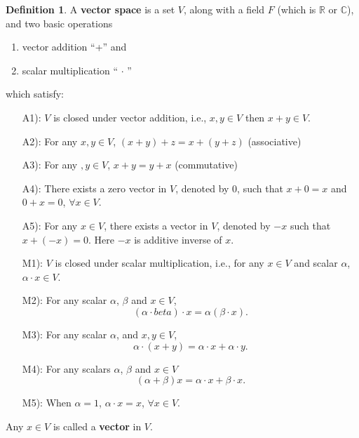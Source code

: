 \documentclass[12pt]{article}
\theoremstyle{definition}
\newtheorem*{definition}{Definition}
\begin{document}
\begin{definition}
A \textbf{vector space} is a set $V$, along with a field $F$ (which is $\mathbb{R}$ or $\mathbb{C}$),
and two basic operations


\begin{enumerate}[label = (\arabic*)]
\item vector addition ``+'' and
\item scalar multiplication `` $\cdot$ ''
\end{enumerate}

which satisfy:

\begin{itemize}
\item [A1):] $V$ is closed under vector addition, i.e., $x, y \in V$ then $x + y \in V$.
\item [A2):] For any $x, y \in V$, $(x + y) + z = x + (y + z)$ (associative)
\item [A3):] For any $, y \in V$, $x + y = y + x$ (commutative)
\item [A4):] There exists a zero vector in $V$, denoted by 0, such that $x + 0 = x$ and
$0 + x = 0$, $\forall x \in V$.
\item [A5):] For any $x \in V$, there exists a vector in $V$, denoted by $-x$ such that
$x + (-x) = 0$. Here $-x$ is additive inverse of $x$.
\item [M1):] $V$ is closed under scalar multiplication, i.e., for any $x \in V$ and scalar
$\alpha$, $\alpha \cdot x \in V$.
\item [M2):] For any scalar $\alpha$, $\beta$ and $x \in V$,
\[
(\alpha \cdot beta) \cdot x = \alpha (\beta \cdot x).
\]
\item [M3):] For any scalar $\alpha$, and $x, y \in V$,
\[
\alpha \cdot (x + y) = \alpha \cdot x + \alpha \cdot y.
\]
\item [M4):] For any scalars $\alpha$, $\beta$ and $x \in V$
\[
(\alpha + \beta) x = \alpha \cdot x + \beta \cdot x. 
\]
\item [M5):] When $\alpha = 1$, $\alpha \cdot x = x$, $\forall x \in V$.
\end{itemize}

Any $x \in V$ is called a \textbf{vector} in $V$.
\end{definition}
\end{document}
